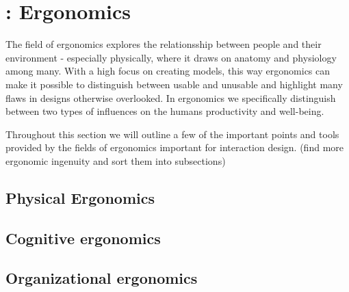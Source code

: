 \section{\todo : Ergonomics} \label{sec:ergonomics} 
The field of ergonomics explores the relationsship between people and their environment - especially physically, where it draws on anatomy and physiology among many.  With a high focus on creating models, this way ergonomics can make it possible to distinguish between usable and unusable and highlight many flaws in designs otherwise overlooked. In ergonomics we specifically distinguish between two types of influences on the humans productivity and well-being.




Throughout this section we will outline a few of the important points and tools provided by the fields of ergonomics important for interaction design. (\todo find more ergonomic ingenuity and sort them into subsections)

\subsection{Physical Ergonomics}



\subsection{Cognitive ergonomics}

\subsection{Organizational ergonomics}


